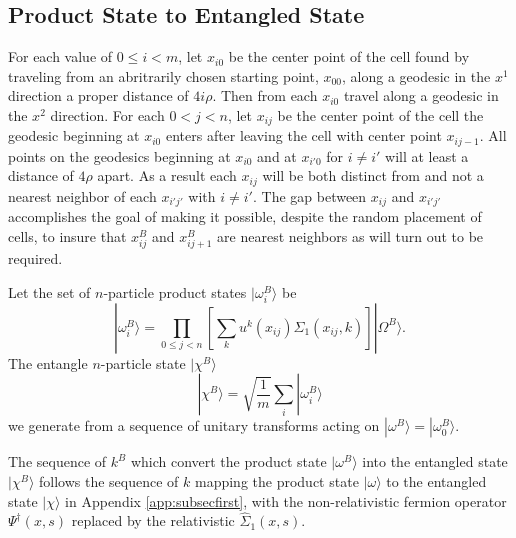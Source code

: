 \documentclass[twocolumn,amsmath,amssymb]{revtex4-1}
\begin{document}
\subsection{\label{app:subsecfirstr} Product State to Entangled State}

For each value of $0 \le i < m$, let $x_{i0}$ be the center point of the cell found
by traveling from an abritrarily chosen starting point, $x_{00}$, along a geodesic in the $x^1$ direction a proper
distance of $4 i \rho$. Then from each $x_{i0}$ travel along a geodesic
in the $x^2$ direction. For each $0 < j < n$, let $x_{ij}$ be the
center point of the cell the geodesic beginning at $x_{i0}$ enters after leaving the
cell with center point $x_{ij-1}$. All points on the geodesics beginning at $x_{i0}$
and at $x_{i'0}$ for $i \ne i'$ will at least a distance of $4 \rho$ apart.
As a result each $x_{ij}$ will be both distinct from and not
a nearest neighbor of each $x_{i'j'}$ with $i \ne i'$.
The gap between  $x_{ij}$ and  $x_{i'j'}$ accomplishes the goal
of making it possible,
despite the random placement of cells, to insure that $x^B_{ij}$ and $x^B_{ij+1}$
are nearest neighbors as will turn out to be required.


Let the set of $n$-particle product states $|\omega^B_i \rangle $ be
\begin{equation}
\label{defomega1}
|\omega^B_i \rangle   =  \prod_{0 \le j < n} [ \sum_k u^k(x_{ij}) \Sigma_1( x_{ij}, k)] |\Omega^B \rangle .
\end{equation}
The entangle $n$-particle state $|\chi^B \rangle $
\begin{equation}
\label{defchi1}
|\chi^B \rangle  = \sqrt{\frac{1}{m}} \sum_i |\omega^B_i \rangle 
\end{equation}
we generate from a sequence of unitary transforms acting
on $|\omega^B \rangle  = |\omega^B_0 \rangle $.

The sequence of $k^B$ which convert the product state $|\omega^B \rangle $
into  the entangled state $|\chi^B \rangle $ follows
the sequence of $k$ mapping the product state $|\omega \rangle $ to the entangled
state $|\chi \rangle $
in Appendix \ref{app:subsecfirst},  with
the non-relativistic fermion operator $\Psi^\dagger( x, s)$ replaced
by the relativistic $\hat{\Sigma}_1( x, s)$.
\end{document}

